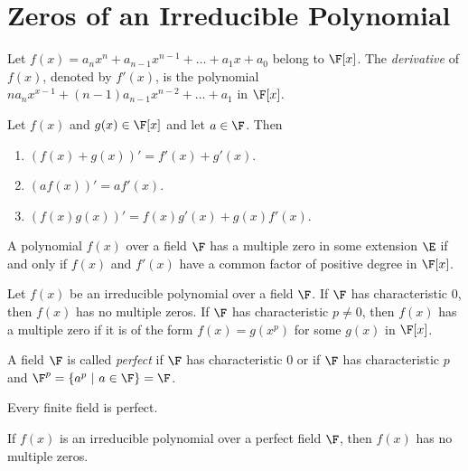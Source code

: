\section{Zeros of an Irreducible Polynomial}

\begin{definition}[Derivative]
	Let $f(x) = a_nx^n + a_{n-1}x^{n-1} + \dots + a_1x + a_0$ belong to $\F[x]$. The \textit{derivative} of $f(x)$, denoted by $f'(x)$, is the polynomial $na_nx^{x-1} + (n-1)a_{n-1}x^{n-2} + \dots + a_1$ in $\F[x]$.
\end{definition}

\begin{lemma}
	Let $f(x)$ and $g(x) \in \F[x]$ and let $a \in \F$. Then
	\begin{enumerate}
		\item $(f(x) + g(x))' = f'(x) + g'(x)$.
		\item $(af(x))' = af'(x)$.
		\item $(f(x)g(x))' = f(x)g'(x) + g(x)f'(x)$.
	\end{enumerate}
\end{lemma}

\begin{theorem}
	A polynomial $f(x)$ over a field $\F$ has a multiple zero in some extension $\E$ if and only if $f(x)$ and $f'(x)$ have a common factor of positive degree in $\F[x]$.
\end{theorem}

\begin{theorem}
	Let $f(x)$ be an irreducible polynomial over a field $\F$. If $\F$ has characteristic 0, then $f(x)$ has no multiple zeros. If $\F$ has characteristic $p \neq 0$, then $f(x)$ has a multiple zero if it is of the form $f(x) = g(x^p)$ for some $g(x)$ in $\F[x]$.
\end{theorem}

\begin{definition}
	A field $\F$ is called \textit{perfect} if $\F$ has characteristic 0 or if $\F$ has characteristic $p$ and $\F^p=\{a^p\ \vert\ a \in \F\} = \F$.
\end{definition}

\begin{theorem}
	Every finite field is perfect.
\end{theorem}

\begin{theorem}
	If $f(x)$ is an irreducible polynomial over a perfect field $\F$, then $f(x)$ has no multiple zeros.
\end{theorem}


